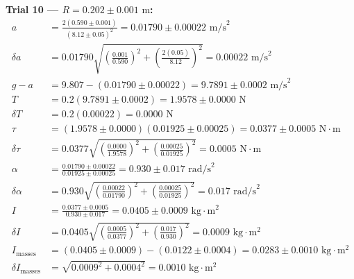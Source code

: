 \documentclass[11pt]{article}
\begin{document}
\textbf{Trial 10 — $R = 0.202 \pm 0.001\text{ m}$:}
\begin{align*}
a &= \frac{2(0.590 \pm 0.001)}{(8.12 \pm 0.05)^2} = 0.01790 \pm 0.00022\text{ m/s}^2 \\
\delta a &= 0.01790\sqrt{\left(\frac{0.001}{0.590}\right)^2 + \left(\frac{2(0.05)}{8.12}\right)^2} = 0.00022\text{ m/s}^2 \\
g - a &= 9.807 - (0.01790 \pm 0.00022) = 9.7891 \pm 0.0002\text{ m/s}^2 \\
T &= 0.2(9.7891 \pm 0.0002) = 1.9578 \pm 0.0000\text{ N} \\
\delta T &= 0.2(0.00022) = 0.0000\text{ N} \\
\tau &= (1.9578 \pm 0.0000)(0.01925 \pm 0.00025) = 0.0377 \pm 0.0005\text{ N}\cdot\text{m} \\
\delta\tau &= 0.0377\sqrt{\left(\frac{0.0000}{1.9578}\right)^2 + \left(\frac{0.00025}{0.01925}\right)^2} = 0.0005\text{ N}\cdot\text{m} \\
\alpha &= \frac{0.01790 \pm 0.00022}{0.01925 \pm 0.00025} = 0.930 \pm 0.017\text{ rad/s}^2 \\
\delta\alpha &= 0.930\sqrt{\left(\frac{0.00022}{0.01790}\right)^2 + \left(\frac{0.00025}{0.01925}\right)^2} = 0.017\text{ rad/s}^2 \\
I &= \frac{0.0377 \pm 0.0005}{0.930 \pm 0.017} = 0.0405 \pm 0.0009\text{ kg}\cdot\text{m}^2 \\
\delta I &= 0.0405\sqrt{\left(\frac{0.0005}{0.0377}\right)^2 + \left(\frac{0.017}{0.930}\right)^2} = 0.0009\text{ kg}\cdot\text{m}^2 \\
I_{\text{masses}} &= (0.0405 \pm 0.0009) - (0.0122 \pm 0.0004) = 0.0283 \pm 0.0010\text{ kg}\cdot\text{m}^2 \\
\delta I_{\text{masses}} &= \sqrt{0.0009^2 + 0.0004^2} = 0.0010\text{ kg}\cdot\text{m}^2
\end{align*}
\end{document}
